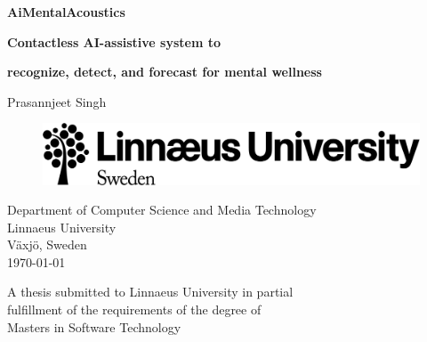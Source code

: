 


\begin{titlepage}
\begin{center}

\vspace*{0.5cm}


{\bfseries\LARGE  AiMentalAcoustics}
\vspace{0.15cm}

{\bfseries\LARGE  Contactless AI-assistive system to}
\vspace{0.15cm}

{\bfseries\LARGE  recognize, detect, and forecast for mental wellness}
\vspace{1.8cm}

{\large Prasannjeet Singh}

\vspace{1cm}
\begin{figure}[ht!]
    \centering
    \includegraphics[width=.8\linewidth]{images/Lnu_Wordmark_Symbol_Sweden_Eng_rgb.png}
  \end{figure}
Department of Computer Science and Media Technology\\
Linnaeus University\\
Växjö, Sweden\\

\vspace{1.5cm}
\today


\vspace{1.0cm}
\noindent
A thesis submitted to Linnaeus University in partial\\
fulfillment of the requirements of the degree of\\
Masters in Software Technology


\end{center}
\end{titlepage}
